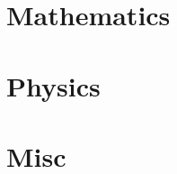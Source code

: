 \documentclass[12pt]{report}
\theoremstyle{definition}
\begin{document}
\maketitle

\part{Mathematics}






\part{Physics}



\part{Misc}

\end{document}
